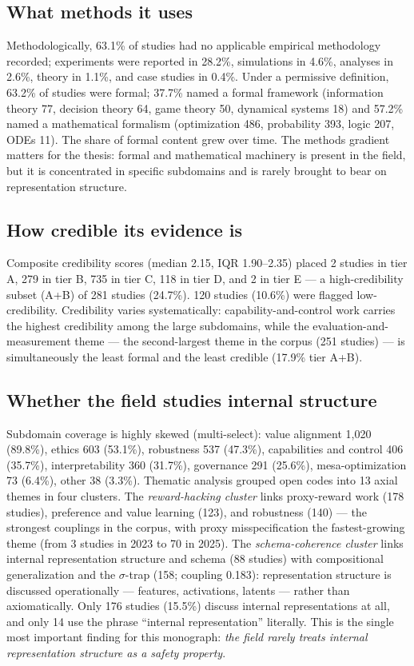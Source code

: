 \subsection{What methods it uses}

Methodologically, 63.1\% of studies had no applicable empirical methodology recorded;
experiments were reported in 28.2\%, simulations in 4.6\%, analyses in 2.6\%, theory in
1.1\%, and case studies in 0.4\%. Under a permissive definition, 63.2\% of studies were
formal; 37.7\% named a formal framework (information theory 77, decision theory 64,
game theory 50, dynamical systems 18) and 57.2\% named a mathematical formalism
(optimization 486, probability 393, logic 207, ODEs 11). The share of formal content
grew over time. The methods gradient matters for the thesis: formal and mathematical
machinery is present in the field, but it is concentrated in specific subdomains and
is rarely brought to bear on representation structure.

\subsection{How credible its evidence is}

Composite credibility scores (median 2.15, IQR 1.90--2.35) placed 2 studies in tier A,
279 in tier B, 735 in tier C, 118 in tier D, and 2 in tier E --- a high-credibility
subset (A+B) of 281 studies (24.7\%). 120 studies (10.6\%) were flagged low-credibility.
Credibility varies systematically: capability-and-control work carries the highest
credibility among the large subdomains, while the evaluation-and-measurement theme ---
the second-largest theme in the corpus (251 studies) --- is simultaneously the least
formal and the least credible (17.9\% tier A+B).

\subsection{Whether the field studies internal structure}
\label{sec:ch2-structure}

Subdomain coverage is highly skewed (multi-select): value alignment 1,020 (89.8\%),
ethics 603 (53.1\%), robustness 537 (47.3\%), capabilities and control 406 (35.7\%),
interpretability 360 (31.7\%), governance 291 (25.6\%), mesa-optimization 73 (6.4\%),
other 38 (3.3\%). Thematic analysis grouped open codes into 13 axial themes in four
clusters. The \emph{reward-hacking cluster} links proxy-reward work (178 studies),
preference and value learning (123), and robustness (140) --- the strongest couplings
in the corpus, with proxy misspecification the fastest-growing theme (from 3 studies in
2023 to 70 in 2025). The \emph{schema-coherence cluster} links internal representation
structure and schema (88 studies) with compositional generalization and the
$\sigma$-trap (158; coupling 0.183): representation structure is discussed
operationally --- features, activations, latents --- rather than axiomatically. Only
176 studies (15.5\%) discuss internal representations at all, and only 14 use the
phrase ``internal representation'' literally. This is the single most important
finding for this monograph: \emph{the field rarely treats internal representation
structure as a safety property}.

